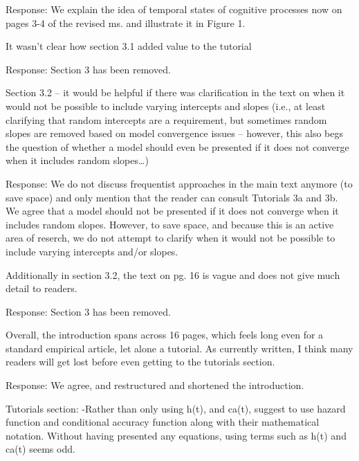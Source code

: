 \documentclass[
]{article}
\renewenvironment{quote}{\begin{leftbar}}{\end{leftbar}}
\begin{document}
Response: We explain the idea of temporal states of cognitive processes
now on pages 3-4 of the revised ms. and illustrate it in Figure 1.

\begin{quote}
It wasn't clear how section 3.1 added value to the tutorial
\end{quote}

Response: Section 3 has been removed.

\begin{quote}
Section 3.2 -- it would be helpful if there was clarification in the
text on when it would not be possible to include varying intercepts and
slopes (i.e., at least clarifying that random intercepts are a
requirement, but sometimes random slopes are removed based on model
convergence issues -- however, this also begs the question of whether a
model should even be presented if it does not converge when it includes
random slopes\ldots)
\end{quote}

Response: We do not discuss frequentist approaches in the main text
anymore (to save space) and only mention that the reader can consult
Tutorials 3a and 3b. We agree that a model should not be presented if it
does not converge when it includes random slopes. However, to save
space, and because this is an active area of reserch, we do not attempt
to clarify when it would not be possible to include varying intercepts
and/or slopes.

\begin{quote}
Additionally in section 3.2, the text on pg. 16 is vague and does not
give much detail to readers.
\end{quote}

Response: Section 3 has been removed.

\begin{quote}
Overall, the introduction spans across 16 pages, which feels long even
for a standard empirical article, let alone a tutorial. As currently
written, I think many readers will get lost before even getting to the
tutorials section.
\end{quote}

Response: We agree, and restructured and shortened the introduction.

\begin{quote}
Tutorials section: -Rather than only using h(t), and ca(t), suggest to
use hazard function and conditional accuracy function along with their
mathematical notation. Without having presented any equations, using
terms such as h(t) and ca(t) seems odd.
\end{quote}
\end{document}
